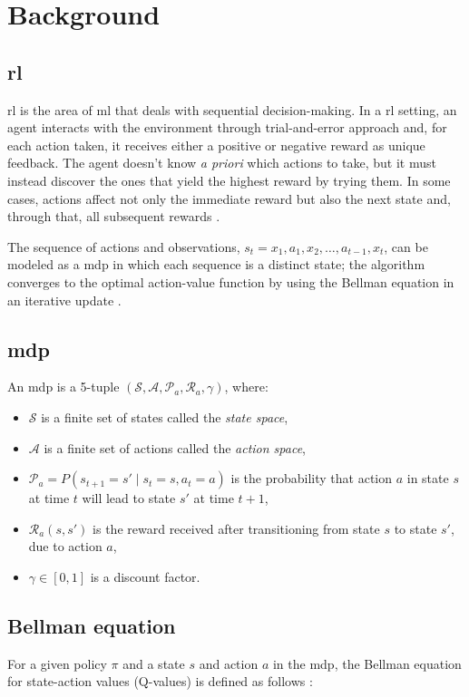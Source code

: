 \section{Background}

\subsection{\acrlong{rl}}
\acrshort{rl} is the area of \acrfull{ml} that deals with sequential decision-making. In a \acrshort{rl} setting, an agent interacts with the environment through trial-and-error approach and, for each action taken, it receives either a positive or negative reward as unique feedback. The agent doesn't know \textit{a priori} which actions to take, but it must instead discover the ones that yield the highest reward by trying them. In some cases, actions affect not only the immediate reward but also the next state and, through that, all subsequent rewards \cite{rlbook,rlbook2}.

The sequence of actions and observations, $s_t = x_1, a_1, x_2, \dots, a_{t-1}, x_t$, can be modeled as a \acrfull{mdp} in which each sequence is a distinct state; the algorithm converges to the optimal action-value function by using the Bellman equation in an iterative update \cite{rlbook,rlbook2,dqn1}.

\subsection{\acrlong{mdp}}
An \acrshort{mdp} \cite{mdp} is a 5-tuple $(\mathcal{S}, \mathcal{A}, \mathcal{P}_a, \mathcal{R}_a, \gamma)$, where:
\begin{itemize}
    \item $\mathcal{S}$ is a finite set of states called the \textit{state space},
    \item $\mathcal{A}$ is a finite set of actions called the \textit{action space},
    \item $\mathcal{P}_a = P(s_{t+1} = s' \mid s_t = s, a_t = a)$ is the probability that action $a$ in state $s$ at time $t$ will lead to state $s'$ at time $t+1$,
    \item $\mathcal{R}_a(s, s')$ is the reward received after transitioning from state $s$ to state $s'$, due to action $a$,
    \item $\gamma \in [0, 1]$ is a discount factor.
\end{itemize}

\subsection{Bellman equation}
For a given policy $\pi$ and a state $s$ and action $a$ in the \acrshort{mdp}, the Bellman equation for state-action values (Q-values) is defined as follows \cite{mdp}:

